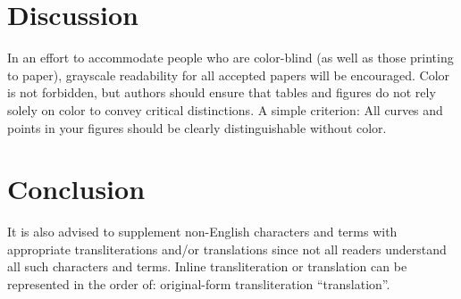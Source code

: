 \documentclass[11pt,a4paper]{article}
\begin{document}
\section{Discussion}
\label{ssec:discussion}

In an effort to accommodate people who are color-blind (as well as those printing
to paper), grayscale readability for all accepted papers will be
encouraged.  Color is not forbidden, but authors should ensure that
tables and figures do not rely solely on color to convey critical
distinctions. A simple criterion: All curves and points in your figures should be clearly distinguishable without color.




\section{Conclusion}

It is also advised to supplement non-English characters and terms
with appropriate transliterations and/or translations
since not all readers understand all such characters and terms.
Inline transliteration or translation can be represented in
the order of: original-form transliteration ``translation''.
\end{document}
